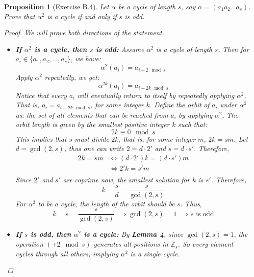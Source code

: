 \documentclass[12pt]{article}
\newcommand{\Z}{\mathbb{Z}} %
\newtheorem{proposition}{Proposition}
\begin{document}
\begin{proposition}[Exercise B.4]
  Let $\alpha$ be a cycle of length $s$, say $\alpha = (a_1 a_2 \ldots a_s)$.
  Prove that $\alpha^2$ is a cycle if and only if $s$ is odd.
  \begin{proof}
    We will prove both directions of the statement.
    \begin{itemize}
      \item \textbf{If $\alpha^2$ is a cycle, then $s$ is odd:}
            Assume $\alpha^2$ is a cycle of length $s$.
            Then for $a_i \in \{a_1, a_2, \ldots, a_s\}$, we have:
            \[
              \alpha^2(a_i) = a_{i + 2 \mod s}
            \]
            Apply $\alpha^2$ repeatedly, we get:
            \[
              \alpha^{2k}(a_i) = a_{i + 2k \mod s}
            \]
            Notice that every $a_i$ will eventually return to itself by repeatedly applying $\alpha^2$.
            That is, $a_i = a_{i + 2k \mod s}$, for some integer $k$.
            Define the orbit of $a_i$ under $\alpha^2$ as: the set of all elements that can be reached from $a_i$ by applying $\alpha^2$.
            The orbit length is given by the smallest positive integer $k$ such that:
            \[
              2k \equiv 0 \mod s
            \]
            This implies that $s$ must divide $2k$, that is, for some integer $m$, $2k = sm$.
            Let $d = \gcd(2, s)$, thus one can write $2 = d \cdot 2'$ and $s = d \cdot s'$.
            Therefore,
            \begin{align*}
              2k = sm & \iff (d \cdot 2')k = (d \cdot s')m \\
                      & \iff 2'k = s'm                     \\
            \end{align*}
            Since $2'$ and $s'$ are coprime now, the smallest solution for $k$ is $s'$.
            Therefore,
            \[
              k = \frac{s}{d} = \frac{s}{\gcd(2, s)}
            \]
            For $\alpha^2$ to be a cycle, the length of the orbit should be $s$. Thus,
            \[
              k = s = \frac{s}{\gcd(2, s)} \implies \gcd(2, s) = 1 \implies s \text{ is odd}
            \]
      \item \textbf{If $s$ is odd, then $\alpha^2$ is a cycle:}
            By \textbf{Lemma 4}, since $\gcd(2, s) = 1$, the operation $(+2 \mod s)$ generates all positions in $\Z_s$.
            So every element cycles through all others, implying $\alpha^2$ is a single cycle.
    \end{itemize}
  \end{proof}
\end{proposition}
\end{document}
